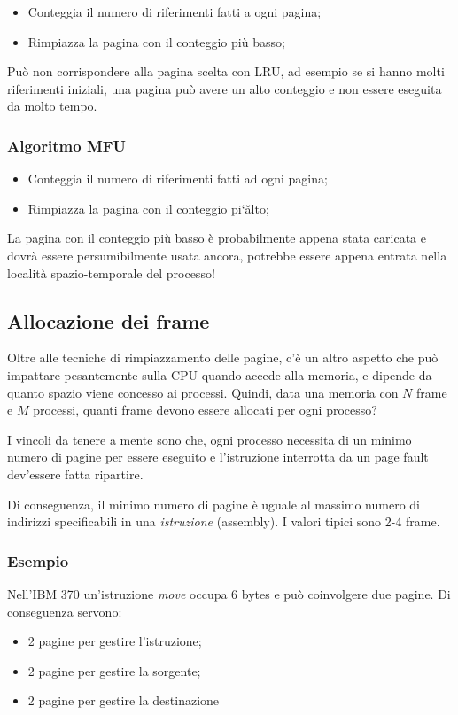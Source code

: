\documentclass[a4paper,12pt, twoside]{report}
\begin{document}
\begin{itemize}
\item Conteggia il numero di riferimenti fatti a ogni pagina;
\item Rimpiazza la pagina con il conteggio pi\`u basso;
\end{itemize}
Pu\`o non corrispondere alla pagina scelta con LRU, ad esempio se si hanno molti riferimenti iniziali, una pagina
pu\`o avere un alto conteggio e non essere eseguita da molto tempo. 


\subsubsection{Algoritmo MFU}

\begin{itemize}
\item Conteggia il numero di riferimenti fatti ad ogni pagina;
\item Rimpiazza la pagina con il conteggio pi`\u alto;
\end{itemize}
La pagina con il conteggio pi\`u basso \`e probabilmente appena stata caricata e dovr\`a essere persumibilmente
usata ancora, potrebbe essere appena entrata nella localit\`a spazio-temporale del processo!

\subsection{Allocazione dei frame}

Oltre alle tecniche di rimpiazzamento delle pagine, c'\`e un altro aspetto che pu\`o impattare pesantemente sulla CPU
quando accede alla memoria, e dipende da quanto spazio viene concesso ai processi. 
Quindi, data una memoria con $N$ frame e $M$ processi, quanti frame devono essere allocati per ogni processo?

I vincoli da tenere a mente sono che, ogni processo necessita di un minimo numero di pagine per essere eseguito e 
l'istruzione interrotta da un page fault dev'essere fatta ripartire. 

Di conseguenza, il minimo numero di pagine \`e uguale al massimo numero di indirizzi 
specificabili in una \emph{istruzione} (assembly). I valori tipici sono 2-4 frame. 

\subsubsection{Esempio}
Nell'IBM 370 un'istruzione \emph{move} occupa 6 bytes e pu\`o coinvolgere due pagine. 
Di conseguenza servono:
\begin{itemize}
    \item 2 pagine per gestire l'istruzione;
    \item 2 pagine per gestire la sorgente;
    \item 2 pagine per gestire la destinazione
\end{itemize}
\end{document}

